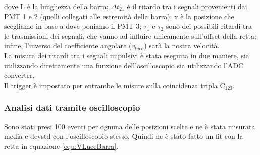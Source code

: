 \documentclass[a4paper,twocolumn]{article}
\begin{document}
dove L è la lunghezza della barra; $\Delta t_{21}$ è il ritardo tra i segnali provenienti dai PMT 1 e 2 (quelli collegati alle estremità della barra); x è la posizione che scegliamo in base a dove poniamo il PMT-3; $\tau_1$ e $\tau_2$ sono dei possibili ritardi tra le trasmissioni dei segnali, che vanno ad influire unicamente sull'offset della retta; infine, l'inverso del coefficiente angolare (\textit{v$_{luce}$}) sarà la nostra velocità.\\
La misura dei ritardi tra i segnali impulsivi è stata eseguita in due maniere, sia utilizzando direttamente una funzione dell'oscilloscopio sia utilizzando l'ADC converter.\\
Il trigger è impostato per entrambe le misure sulla coincidenza tripla C$_{123}$.

\subsubsection{Analisi dati tramite oscilloscopio}
\label{sec:VBarOsc}
Sono stati presi 100 eventi per ognuna delle posizioni scelte e ne è stata misurata media e devstd con l'oscilloscopio stesso. Quindi ne è stato fatto un fit con la retta in equazione \ref{equ:VLuceBarra}.
\end{document}
